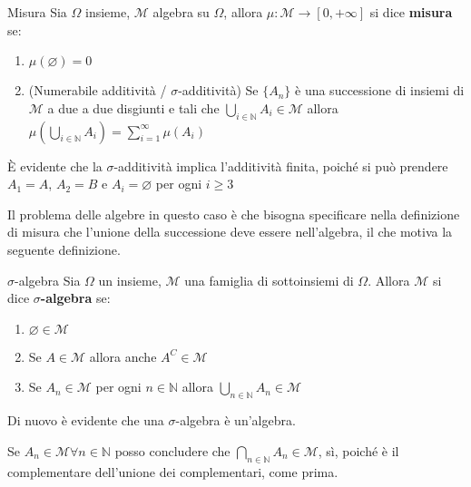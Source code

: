 \begin{definition}{Misura}
    Sia \(\Omega\) insieme, \(\mathcal{M}\) algebra su \(\Omega\), allora \(\mu
    : \mathcal{M} \to [0, +\infty]\) si dice \textbf{misura} se:
\begin{enumerate}[label = \arabic*.]
    \item \(\mu(\varnothing) = 0\) 
    \item (Numerabile additività / \(\sigma\)-additività) Se \(\{A_{n}\} \) è una successione di insiemi di \(\mathcal{M}\) a
        due a due disgiunti e tali che  \(\bigcup_{i \in \mathbb{N}} A_{i} \in
        \mathcal{M}\) allora \(\mu\left( \bigcup_{i \in \mathbb{N}} A_{i}
        \right) = \sum_{i=1}^{\infty} \mu(A_{i})  \) 
\end{enumerate}
\end{definition}
\begin{remark}
    È evidente che la \(\sigma\)-additività implica l'additività finita, poiché
    si può prendere \(A_{1} = A\), \(A_{2} = B\) e \(A_{i} = \varnothing\) per
    ogni \(i \ge 3\) 
\end{remark}
Il problema delle algebre in questo caso è che bisogna specificare nella
definizione di misura che l'unione della successione deve essere nell'algebra,
il che motiva la seguente definizione.
\begin{definition}{\(\sigma\)-algebra}
    Sia \(\Omega\) un insieme, \(\mathcal{M}\) una famiglia di sottoinsiemi di
    \(\Omega\). Allora \(\mathcal{M}\) si dice \textbf{\(\sigma\)-algebra} se:
\begin{enumerate}[label = \arabic*.]
    \item \(\varnothing \in \mathcal{M}\) 
    \item Se \(A \in \mathcal{M}\) allora anche \(A^{C}\in \mathcal{M}\) 
    \item Se \(A_{n} \in \mathcal{M}\) per ogni \(n \in \mathbb{N}\) allora
        \(\bigcup_{n \in \mathbb{N}} A_{n} \in \mathcal{M}\) 
\end{enumerate}
\end{definition}
\begin{remark}
    Di nuovo è evidente che una \(\sigma\)-algebra è un'algebra.
\end{remark}
\begin{remark}
    Se \(A_{n} \in \mathcal{M} \forall n \in \mathbb{N}\) posso concludere che
    \(\bigcap_{n \in \mathbb{N}} A_{n} \in \mathcal{M} \), sì, poiché è il
    complementare dell'unione dei complementari, come prima.
\end{remark}


